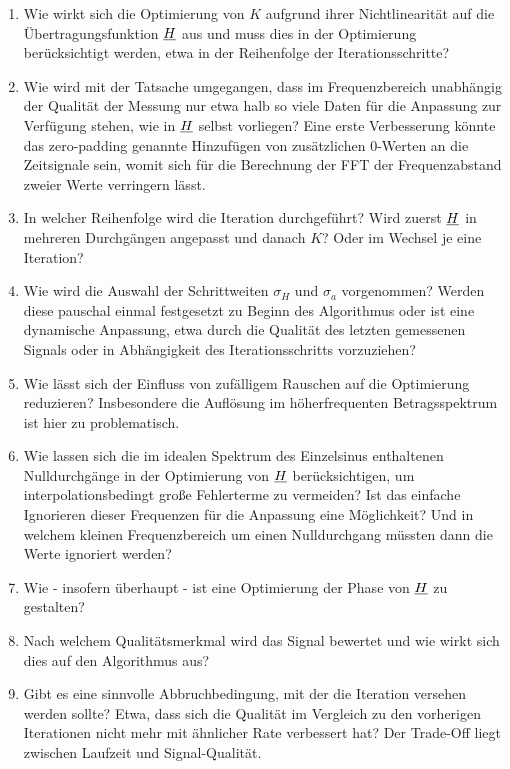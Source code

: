 \documentclass[../Report.tex]{subfiles}
\begin{document}
\begin{enumerate}
	\item 	Wie wirkt sich die Optimierung von $K$ aufgrund ihrer Nichtlinearität auf die Übertragungsfunktion $\underline{H}$ aus und muss dies in der Optimierung berücksichtigt werden, etwa in der Reihenfolge der Iterationsschritte?
	
	\item	Wie wird mit der Tatsache umgegangen, dass im Frequenzbereich unabhängig der Qualität der Messung nur etwa halb so viele Daten für die Anpassung zur Verfügung stehen, wie in $\underline{H}$ selbst vorliegen? Eine erste Verbesserung könnte das zero-padding genannte Hinzufügen von zusätzlichen $0$-Werten an die Zeitsignale sein, womit sich für die Berechnung der FFT der Frequenzabstand zweier Werte verringern lässt. 
	
	\item	In welcher Reihenfolge wird die Iteration durchgeführt? Wird zuerst $\underline{H}$ in mehreren Durchgängen angepasst und danach $K$? Oder im Wechsel je eine Iteration?
	
	\item 	Wie wird die Auswahl der Schrittweiten $\sigma_H$ und $\sigma_a$ vorgenommen? Werden diese pauschal einmal festgesetzt zu Beginn des Algorithmus oder ist eine dynamische Anpassung, etwa durch die Qualität des letzten gemessenen Signals oder in Abhängigkeit des Iterationsschritts vorzuziehen? 
	
	\item 	Wie lässt sich der Einfluss von zufälligem Rauschen auf die Optimierung reduzieren? Insbesondere die Auflösung im höherfrequenten Betragsspektrum ist hier zu problematisch.
	
	\item	Wie lassen sich die im idealen Spektrum des Einzelsinus enthaltenen Nulldurchgänge in der Optimierung von $\underline{H}$ berücksichtigen, um interpolationsbedingt große Fehlerterme zu vermeiden? Ist das einfache Ignorieren dieser Frequenzen für die Anpassung eine Möglichkeit? Und in welchem kleinen Frequenzbereich um einen Nulldurchgang müssten dann die Werte ignoriert werden?
	
	\item 	Wie - insofern überhaupt - ist eine Optimierung der Phase von $\underline{H}$ zu gestalten?
	
	\item	Nach welchem Qualitätsmerkmal wird das Signal bewertet und wie wirkt sich dies auf den Algorithmus aus?
	
	\item	Gibt es eine sinnvolle Abbruchbedingung, mit der die Iteration versehen werden sollte? Etwa, dass sich die Qualität im Vergleich zu den vorherigen Iterationen nicht mehr mit ähnlicher Rate verbessert hat? Der Trade-Off liegt zwischen Laufzeit und Signal-Qualität.
	

\end{enumerate}
\end{document}
